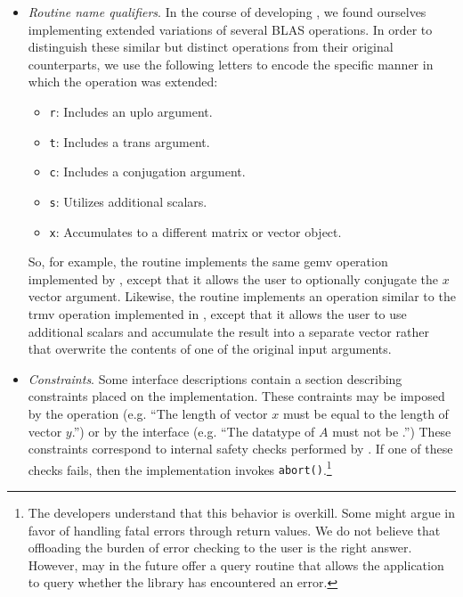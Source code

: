 \begin{itemize}
\item
{\em Routine name qualifiers}.
In the course of developing \libflamens, we found ourselves implementing
extended variations of several BLAS operations.
In order to distinguish these similar but distinct operations from their
original counterparts, we use the following letters to encode the specific
manner in which the operation was extended:
\begin{itemize}
\item {\tt r}: Includes an uplo argument.
\item {\tt t}: Includes a trans argument.
\item {\tt c}: Includes a conjugation argument.
\item {\tt s}: Utilizes additional scalars.
\item {\tt x}: Accumulates to a different matrix or vector object.
\end{itemize}
So, for example, the \libflame routine \flagemvcext implements
the same {\sc gemv} operation implemented by \flagemvextns, except
that it allows the user to optionally conjugate the $ x $ vector argument.
Likewise, the routine \flatrmvsxext implements an operation
similar to the {\sc trmv} operation implemented in \flatrmvextns,
except that it allows the user to use additional scalars and accumulate
the result into a separate vector rather that overwrite the contents
of one of the original input arguments.

\item
{\em Constraints}.
Some interface descriptions contain a section describing constraints
placed on the implementation.
These contraints may be imposed by the operation (e.g. ``The length of
vector $ x $ must be equal to the length of vector $ y $.'') or by
the interface (e.g. ``The datatype of $ A $ must not be \flaconstantns.'')
These constraints correspond to internal safety checks performed by
\libflamens.
If one of these checks fails, then the implementation invokes
{\tt abort()}.\footnote{The \libflame developers understand that this
behavior is overkill.
Some might argue in favor of handling fatal errors through return values.
We do not believe that offloading the burden of error checking to the
user is the right answer.
However, \libflame may in the future offer a query routine that allows
the application to query whether the library has encountered an error.
}


\end{itemize}
